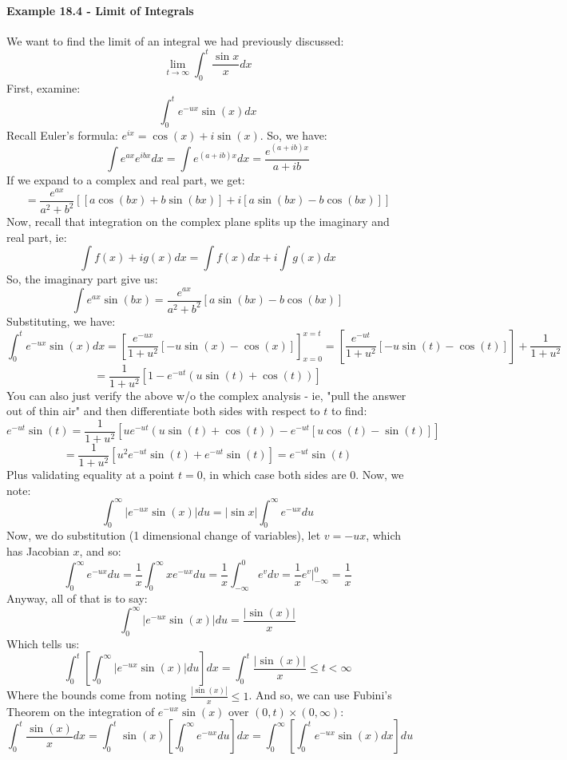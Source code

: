 \documentclass[12pt,a4paper]{article}
\newcommand{\1}[1]{\mathbbm{1}\left\{ #1 \right\}}
\begin{document}
\paragraph{Example 18.4 - Limit of Integrals} We want to find the limit of an integral we had previously discussed:
$$
	\lim_{t \to \infty} \int_0^t \frac{\sin x}{x} dx
$$
First, examine:
$$
	\int_0^t e^{-ux} \sin(x) dx
$$
Recall Euler's formula: $e^{ix} = \cos(x) + i\sin(x)$. So, we have:
$$
	\int e^{ax}e^{ibx} dx = \int e^{(a + ib)x} dx = \frac{e^{(a+ib)x}}{a + ib}
$$
If we expand to a complex and real part, we get:
$$
	= \frac{e^{ax}}{a^2 + b^2}\left[[a\cos(bx) + b\sin(bx)] + i[a\sin(bx) - b\cos(bx)]\right]
$$
Now, recall that integration on the complex plane splits up the imaginary and real part, ie:
$$
	\int f(x) + ig(x) dx = \int f(x) dx + i \int g(x) dx
$$
So, the imaginary part give us:
$$
	\int e^{ax}\sin(bx) = \frac{e^{ax}}{a^2 + b^2}\left[a\sin(bx) - b\cos(bx)\right]
$$
Substituting, we have:
$$
	\int_0^t e^{-ux} \sin(x) dx =
	\left[\frac{e^{-ux}}{1 + u^2}\left[-u\sin(x) - \cos(x)\right]\right]_{x=0}^{x=t} =
	\left[\frac{e^{-ut}}{1 + u^2}\left[-u\sin(t) - \cos(t)\right]\right] +
	\frac{1}{1 + u^2}
$$
$$
	= \frac{1}{1 + u^2}\left[1 - e^{-ut}\left(u\sin(t) + \cos(t)\right)\right]
$$
You can also just verify the above w/o the complex analysis - ie, "pull the answer out of thin air" and then differentiate both sides with respect to $t$ to find:
$$
	e^{-ut} \sin(t) =
	\frac{1}{1 + u^2}\left[ue^{-ut}\left(u\sin(t) + \cos(t)\right) - e^{-ut}\left[u\cos(t) - \sin(t)\right]\right]
$$
$$
	= \frac{1}{1 + u^2}\left[u^2e^{-ut}\sin(t) + e^{-ut}\sin(t)\right] = e^{-ut} \sin(t)
$$
Plus validating equality at a point $t = 0$, in which case both sides are 0. Now, we note:
$$
	\int_0^\infty \left|e^{-ux}\sin(x)\right| du =
	|\sin x| \int_0^\infty e^{-ux} du
$$
Now, we do substitution (1 dimensional change of variables), let $v = -ux$, which has Jacobian $x$, and so:
$$
	\int_0^\infty e^{-ux} du = \frac{1}{x}\int_0^\infty xe^{-ux} du = \frac{1}{x}\int_{-\infty}^0 e^v dv = \frac{1}{x}e^v\bigg|_{-\infty}^0 = \frac{1}{x}
$$
Anyway, all of that is to say:
$$
	\int_0^\infty \left|e^{-ux}\sin(x)\right| du = \frac{|\sin(x)|}{x}
$$
Which tells us:
$$
	\int_0^t \left[\int_0^\infty \left|e^{-ux}\sin(x)\right| du\right] dx = \int_0^t \frac{|\sin(x)|}{x} \leq t < \infty
$$
Where the bounds come from noting $\frac{|\sin(x)|}{x} \leq 1$. And so, we can use Fubini's Theorem on the integration of $e^{-ux} \sin(x)$ over $(0, t) \times (0, \infty)$:
$$
	\int_0^t \frac{\sin(x)}{x} dx =
	\int_0^t \sin(x) \left[\int_0^{\infty} e^{-ux} du \right]dx =
	\int_0^\infty \left[\int_0^t e^{-ux}\sin(x) dx\right] du
$$
\end{document}
